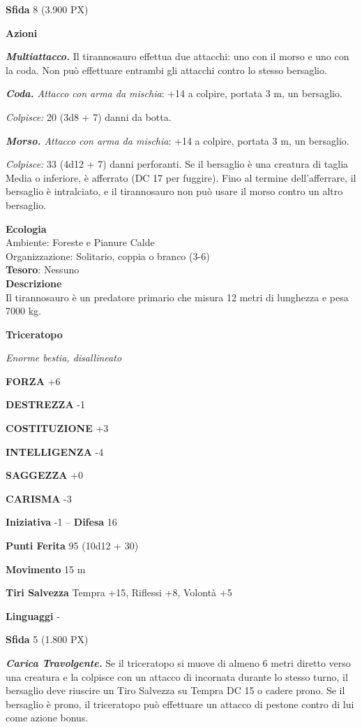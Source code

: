 \begin{multicols}{2}
\textbf{Sfida} 8 (3.900 PX)

\textbf{Azioni}

\textit{\textbf{Multiattacco.}} Il tirannosauro effettua due attacchi: uno con il morso e uno con la coda. Non può effettuare entrambi gli attacchi contro lo stesso bersaglio.

\textit{\textbf{Coda.} Attacco con arma da mischia}: +14 a colpire, portata 3 m, un bersaglio.

\textit{Colpisce:} 20 (3d8 + 7) danni da botta.

\textit{\textbf{Morso.} Attacco con arma da mischia}: +14 a colpire, portata 3 m, un bersaglio.

\textit{Colpisce:} 33 (4d12 + 7) danni perforanti. Se il bersaglio è una creatura di taglia Media o inferiore, è afferrato (DC 17 per fuggire). Fino al termine dell'afferrare, il bersaglio è intralciato, e il tirannosauro non può usare il morso contro un altro bersaglio.

\textbf{Ecologia}\\
Ambiente: Foreste e Pianure Calde\\
Organizzazione: Solitario, coppia o branco (3-6)\\
\textbf{Tesoro}: Nessuno\\
\textbf{Descrizione}\\
Il tirannosauro è un predatore primario che misura 12 metri di lunghezza e pesa 7000 kg.


\medskip{}\textbf{Triceratopo}

\textit{Enorme bestia, disallineato}

\textbf{FORZA} +6

\textbf{DESTREZZA} -1

\textbf{COSTITUZIONE} +3

\textbf{INTELLIGENZA} -4

\textbf{SAGGEZZA} +0

\textbf{CARISMA} -3

\textbf{Iniziativa} -1 -- \textbf{Difesa} 16

\textbf{Punti Ferita} 95 (10d12 + 30)

\textbf{Movimento} 15 m

\textbf{Tiri Salvezza} Tempra +15, Riflessi +8, Volontà +5

\textbf{Linguaggi} -

\textbf{Sfida} 5 (1.800 PX)

\textit{\textbf{Carica Travolgente.}} Se il triceratopo si muove di almeno 6 metri diretto verso una creatura e la colpisce con un attacco di incornata durante lo stesso turno, il bersaglio deve riuscire un Tiro Salvezza su Tempra DC 15 o cadere prono. Se il bersaglio è prono, il triceratopo può effettuare un attacco di pestone contro di lui come azione bonus.


\end{multicols}
